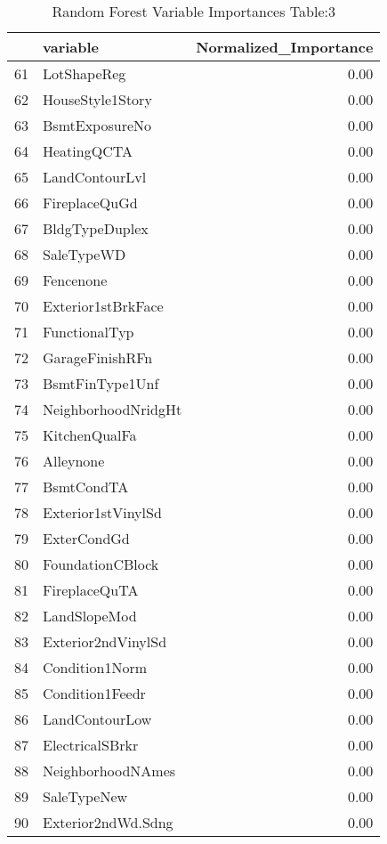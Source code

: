 \begin{table}[ht]
\centering
\begin{tabular}{rlr}
  \hline
 & variable & Normalized\_Importance \\ 
  \hline
61 & LotShapeReg & 0.00 \\ 
  62 & HouseStyle1Story & 0.00 \\ 
  63 & BsmtExposureNo & 0.00 \\ 
  64 & HeatingQCTA & 0.00 \\ 
  65 & LandContourLvl & 0.00 \\ 
  66 & FireplaceQuGd & 0.00 \\ 
  67 & BldgTypeDuplex & 0.00 \\ 
  68 & SaleTypeWD & 0.00 \\ 
  69 & Fencenone & 0.00 \\ 
  70 & Exterior1stBrkFace & 0.00 \\ 
  71 & FunctionalTyp & 0.00 \\ 
  72 & GarageFinishRFn & 0.00 \\ 
  73 & BsmtFinType1Unf & 0.00 \\ 
  74 & NeighborhoodNridgHt & 0.00 \\ 
  75 & KitchenQualFa & 0.00 \\ 
  76 & Alleynone & 0.00 \\ 
  77 & BsmtCondTA & 0.00 \\ 
  78 & Exterior1stVinylSd & 0.00 \\ 
  79 & ExterCondGd & 0.00 \\ 
  80 & FoundationCBlock & 0.00 \\ 
  81 & FireplaceQuTA & 0.00 \\ 
  82 & LandSlopeMod & 0.00 \\ 
  83 & Exterior2ndVinylSd & 0.00 \\ 
  84 & Condition1Norm & 0.00 \\ 
  85 & Condition1Feedr & 0.00 \\ 
  86 & LandContourLow & 0.00 \\ 
  87 & ElectricalSBrkr & 0.00 \\ 
  88 & NeighborhoodNAmes & 0.00 \\ 
  89 & SaleTypeNew & 0.00 \\ 
  90 & Exterior2ndWd.Sdng & 0.00 \\ 
   \hline
\end{tabular}
\caption{Random Forest Variable Importances Table:3} 
\label{tab:importance3}
\end{table}

